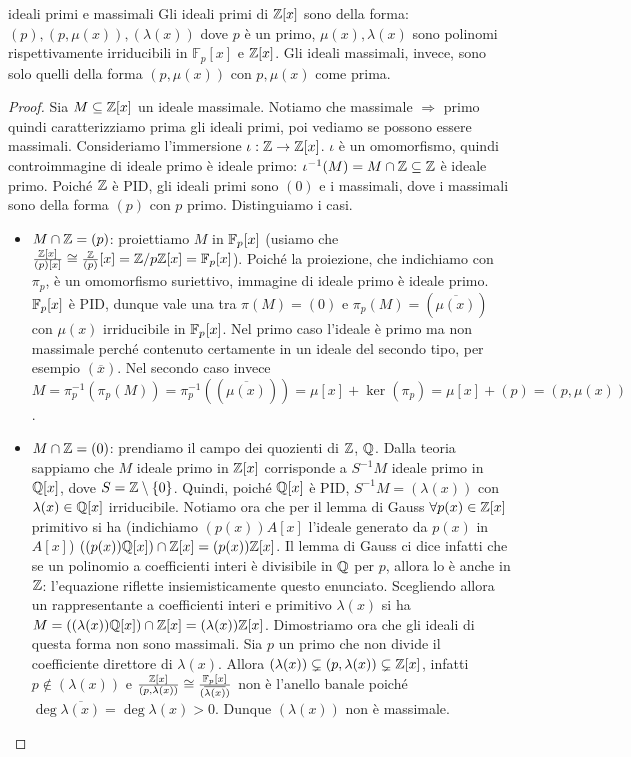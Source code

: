\begin{proposition}{ideali primi e massimali}
    Gli ideali primi di $\mathbb{Z}[x]$ sono della forma: $(p), (p, \mu(x)), (\lambda(x))$ dove $p$ è un primo, $\mu(x), \lambda(x)$ sono polinomi rispettivamente irriducibili in $\mathbb{F}_p[x]$ e $\mathbb{Z}[x]$. Gli ideali massimali, invece, sono solo quelli della forma $(p,\mu(x))$ con $p, \mu(x)$ come prima. 
\end{proposition}
\begin{proof}
    Sia $M \subseteq \mathbb{Z}[x]$ un ideale massimale. Notiamo che massimale $\Rightarrow$ primo quindi caratterizziamo prima gli ideali primi, poi vediamo se possono essere massimali. Consideriamo l'immersione $\iota: \mathbb{Z} \rightarrow \mathbb{Z}[x]$. $\iota$ è un omomorfismo, quindi controimmagine di ideale primo è ideale primo: $\iota^{-1}(M) = M \cap \mathbb{Z} \subseteq \mathbb{Z}$ è ideale primo. Poiché $\mathbb{Z}$ è PID, gli ideali primi sono $(0)$ e i massimali, dove i massimali sono della forma $(p)$ con $p$ primo. Distinguiamo i casi.
    \begin{itemize}
        \item $M\cap \mathbb{Z} = (p)$: proiettiamo $M$ in $ \mathbb{F}_p [x]$ (usiamo che $\frac{\mathbb{Z}[x]}{(p)[x]} \cong \frac{\mathbb{Z}}{(p)}[x] = \mathbb{Z}/p\mathbb{Z}[x] = \mathbb{F}_p[x]$). Poiché la proiezione, che indichiamo con $\pi_p$, è un omomorfismo suriettivo, immagine di ideale primo è ideale primo. $\mathbb{F}_p [x]$ è PID, dunque vale una tra $\pi(M) = (0)$ e $\pi_p(M) = (\overline{\mu(x)}) $ con $\mu(x)$ irriducibile in $\mathbb{F}_p[x]$. Nel primo caso l'ideale è primo ma non massimale perché contenuto certamente in un ideale del secondo tipo, per esempio $(\overline{x})$. Nel secondo caso invece $M = \pi_p^{-1}(\pi_p(M)) = \pi_p^{-1}((\overline{\mu(x)})) = \mu[x] + \ker(\pi_p) = \mu[x]+(p) = (p,\mu(x))$. 
        \item $M\cap \mathbb{Z} = (0)$: prendiamo il campo dei quozienti di $\mathbb{Z}$, $\mathbb{Q}$. Dalla teoria sappiamo che $M$ ideale primo in $\mathbb{Z}[x]$ corrisponde a $S^{-1}M$ ideale primo in $\mathbb{Q}[x]$, dove $S=\mathbb{Z}\setminus \{0\}$. Quindi, poiché $\mathbb{Q}[x]$ è PID, $S^{-1}M = (\lambda(x))$ con $\lambda(x) \in \mathbb{Q}[x]$ irriducibile. Notiamo ora che per il lemma di Gauss $\forall p(x) \in \mathbb{Z}[x]$ primitivo si ha (indichiamo $(p(x))A[x]$ l'ideale generato da $p(x)$ in $A[x]$) $((p(x))\mathbb{Q}[x]) \cap \mathbb{Z}[x] = (p(x))\mathbb{Z}[x]$. Il lemma di Gauss ci dice infatti che se un polinomio a coefficienti interi è divisibile in $\mathbb{Q}$ per $p$, allora lo è anche in $\mathbb{Z}$: l'equazione riflette insiemisticamente questo enunciato.
        Scegliendo allora un rappresentante a coefficienti interi e primitivo $\lambda(x)$ si ha $M = ((\lambda(x))\mathbb{Q}[x]) \cap \mathbb{Z}[x] = (\lambda(x))\mathbb{Z}[x]$. Dimostriamo ora che gli ideali di questa forma non sono massimali. Sia $p$ un primo che non divide il coefficiente direttore di $\lambda(x)$. Allora $(\lambda(x)) \subsetneq (p, \lambda(x)) \subsetneq \mathbb{Z}[x]$, infatti $p \notin (\lambda(x))$ e $\frac{\mathbb{Z}[x]}{(p, \lambda(x))} \cong \frac{\mathbb{F}_p[x]}{(\overline{\lambda(x)})}$ non è l'anello banale poiché $\deg \overline{\lambda(x)} = \deg \lambda(x) > 0$. Dunque $(\lambda(x))$ non è massimale.

\end{itemize}
\end{proof}

